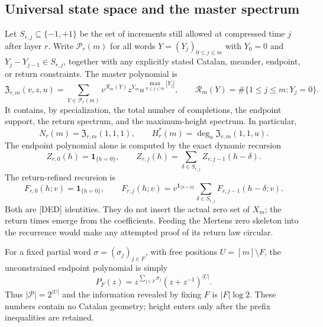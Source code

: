 \documentclass[11pt]{amsart}
\numberwithin{equation}{section}
\theoremstyle{plain}
\theoremstyle{definition}
\theoremstyle{remark}
\begin{document}
\subsection{Universal state space and the master spectrum}

Let $S_{r,j}\subseteq\{-1,+1\}$ be the set of increments still allowed at
compressed time $j$ after layer $r$.  Write $\mathcal P_r(m)$ for all words
$Y=(Y_j)_{0\le j\le m}$ with $Y_0=0$ and
$Y_j-Y_{j-1}\in S_{r,j}$, together with any explicitly stated Catalan,
meander, endpoint, or return constraints.  The master polynomial is
\begin{equation}
\boxed{
\mathfrak Z_{r,m}(v,z,u)
=\sum_{Y\in\mathcal P_r(m)}
v^{\mathcal R_m(Y)}z^{Y_m}u^{\max_{0\le j\le m}|Y_j|}},
\qquad
\mathcal R_m(Y)=\#\{1\le j\le m:Y_j=0\}.
\label{eq:v9_master_spectrum}
\end{equation}
It contains, by specialization, the total number of completions, the endpoint
support, the return spectrum, and the maximum-height spectrum.  In particular,
\begin{equation}
N_r(m)=\mathfrak Z_{r,m}(1,1,1),\qquad
H_r^*(m)=\deg_u\mathfrak Z_{r,m}(1,1,u).
\label{eq:v9_master_specializations}
\end{equation}
The endpoint polynomial alone is computed by the exact dynamic recursion
\begin{equation}
Z_{r,0}(h)=\mathbf 1_{\{h=0\}},\qquad
Z_{r,j}(h)=\sum_{\delta\in S_{r,j}}Z_{r,j-1}(h-\delta).
\label{eq:v9_endpoint_dp}
\end{equation}
The return-refined recursion is
\begin{equation}
F_{r,0}(h;v)=\mathbf 1_{\{h=0\}},\qquad
F_{r,j}(h;v)=v^{\mathbf 1_{\{h=0\}}}
\sum_{\delta\in S_{r,j}}F_{r,j-1}(h-\delta;v).
\label{eq:v9_return_dp}
\end{equation}
Both are \textup{[DED]} identities.  They do not insert the actual zero set of
$X_m$; the return times emerge from the coefficients.  Feeding the Mertens zero
skeleton into the recurrence would make any attempted proof of its return law
circular.

For a fixed partial word $\sigma=(\sigma_j)_{j\in F}$, with free positions
$U=[m]\setminus F$, the unconstrained endpoint polynomial is simply
\begin{equation}
P_{F}(z)=z^{\sum_{j\in F}\sigma_j}(z+z^{-1})^{|U|}.
\label{eq:v9_unconstrained_endpoint}
\end{equation}
Thus $|\mathcal P|=2^{|U|}$ and the information revealed by fixing $F$ is
$|F|\log 2$.  These numbers contain no Catalan geometry; height enters only
after the prefix inequalities are retained.
\end{document}
